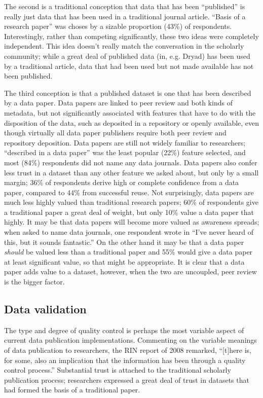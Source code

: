 \documentclass[10pt]{article}
\begin{document}
The second is a traditional conception that data that has been ``published'' is really just data that has been used in a traditional journal article. 
``Basis of a research paper'' was choses by a sizable proportion (43\%) of respondents.
Interestingly, rather than competing significantly, these two ideas were completely independent.
This idea doesn't really match the conversation in the scholarly community; while a great deal of published data (in, e.g. Dryad) has been used by a traditional article, data that had been used but not made available has not been published.

The third conception is that a published dataset is one that has been described by a data paper.
Data papers are linked to peer review and both kinds of metadata, but not significantly associated with features that have to do with the disposition of the data, such as deposited in a repository or openly available, even though virtually all data paper publishers require both peer review and repository deposition.
Data papers are still not widely familiar to researchers; ``described in a data paper'' was the least popular (22\%) feature selected, and most (84\%) respondents did not name any data journals.
Data papers also confer less trust in a dataset than any other feature we asked about, but only by a small margin; 36\% of respondents derive high or complete confidence from a data paper, compared to 44\% from successful reuse.
Not surprisingly, data papers are much less highly valued than traditional research papers; 60\% of respondents give a traditional paper a great deal of weight, but only 10\% value a data paper that highly.
It may be that data papers will become more valued as awareness spreads; when asked to name data journals, one respondent wrote in ``I've never heard of this, but it sounds fantastic.''
On the other hand it may be that a data paper \emph{should} be valued less than a traditional paper and 55\% would give a data paper at least significant value, so that might be appropriate.
It is clear that a data paper adds value to a dataset, however, when the two are uncoupled, peer review is the bigger factor.
 
\subsection*{Data validation}

The type and degree of quality control is perhaps the most variable aspect of current data publication implementations. 
Commenting on the variable meanings of data publication to researchers, the RIN report of 2008 remarked, ``[t]here is, for some, also an implication that the information has been through a quality control process.''\cite{swan_share_2008}
Substantial trust is attached to the traditional scholarly publication process; researchers expressed a great deal of trust in datasets that had formed the basis of a traditional paper.
\end{document}
